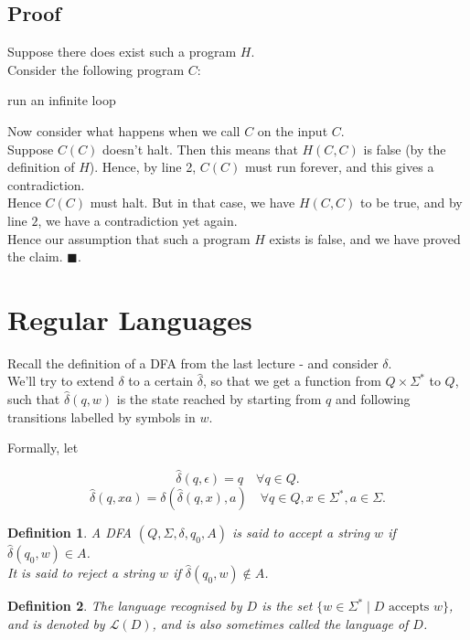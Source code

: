 \documentclass[a4paper]{article}
\newtheorem{defn}{Definition}
\newcommand{\nl}{\vspace{0.2cm}\\}
\newcommand{\mc}{\mathcal}
\begin{document}
\subsection{Proof}
Suppose there does exist such a program $H$.\nl
Consider the following program $C$:
\begin{algorithmic}[1]
            \State run an infinite loop
        \Else
            \State \Return
        \EndIf
    \EndFunction
\end{algorithmic}
Now consider what happens when we call $C$ on the input $C$.\nl
Suppose $C(C)$ doesn't halt. Then this means that $H(C, C)$ is false (by the definition of $H$).
Hence, by line 2, $C(C)$ must run forever, and this gives a contradiction.\nl
Hence $C(C)$ must halt. But in that case, we have $H(C, C)$ to be true, and by line $2$, we have a contradiction yet again.\nl
Hence our assumption that such a program $H$ exists is false, and we have proved the claim. $\blacksquare$.

\fi


\section{Regular Languages}

Recall the definition of a DFA from the last lecture - and consider $\delta$.\\

We'll try to extend $\delta$ to a certain $\hat{\delta}$, so that we get a function from $Q \times \Sigma^*$ to $Q$, such that $\hat{\delta}(q, w)$ is the state reached by starting from $q$ and
following transitions labelled by symbols in $w$.

Formally, let

\[
    \hat{\delta}(q, \epsilon) = q \quad \forall q \in Q
.\]
\[
    \hat{\delta}(q, xa) = \delta(\hat{\delta}(q, x), a) \quad \forall q \in Q, x \in \Sigma^*, a \in \Sigma
.\] 

\begin{defn}
    A DFA $(Q, \Sigma, \delta, q_0, A)$ is said to accept a string $w$ if $\hat{\delta}(q_0, w) \in A$.\\
    It is said to reject a string $w$ if $\hat{\delta}(q_0, w) \not\in A$.
\end{defn}

\begin{defn}
    The language recognised by $D$ is the set $\{w \in \Sigma^* \mid D \text{ accepts } w\}$, and is denoted by $\mc{L}(D)$, and is also sometimes called the language of $D$.
\end{defn}
\end{document}
